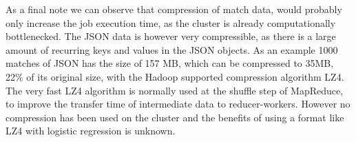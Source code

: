 As a final note we can observe that compression of match data, would probably only increase the job execution time, as the cluster is already computationally bottlenecked. The JSON data is however very compressible, as there is a large amount of recurring keys and values in the JSON objects. As an example 1000 matches of JSON has the size of 157 MB, which can be compressed to 35MB, 22\% of its original size, with the Hadoop supported compression algorithm LZ4. The very fast LZ4 algorithm is normally used at the shuffle step of MapReduce, to improve the transfer time of intermediate data to reducer-workers. However no compression has been used on the cluster and the benefits of using a format like LZ4 with logistic regression is unknown.




